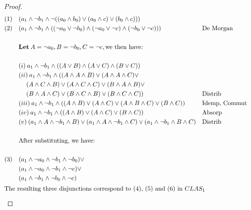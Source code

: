 \documentclass{article}
\begin{document}
\begin{proof}
\begin{align*}
	(1)  & \quad (a_1 \land \lnot b_1 \land \lnot((a_0 \land b_0) \lor (a_0 \land c) \lor (b_0 \land c)) ) \\
	(2)  & \quad (a_1 \land \lnot b_1 \land ((\lnot a_0 \lor \lnot b_0) \land (\lnot a_0 \lor \lnot c) \land (\lnot b_0 \lor \lnot c)))  && \text{De Morgan} \\ \\
	&	\quad \textbf{Let} \:  A = \lnot a_0, B = \lnot b_0, C = \lnot c, \text{we then have:} \\ \\
	& \quad (i)  \: a_1 \land \lnot b_1 \land ((A \lor B) \land (A \lor C) \land (B \lor C)) \\
	&	\quad (ii)  \: a_1 \land \lnot b_1 \land ((A \land A \land B) \lor 						(A \land A 	\land C) \lor \\
		& \qquad \: (A \land C \land B) \lor (A \land C \land C) \lor (B \land A \land B) \lor \\
		& \qquad \: (B \land A \land C) \lor (B \land C \land B) \lor
		(B \land C \land C)) && \text{Distrib} \\
	& \quad (iii)  \: a_1 \land \lnot b_1 \land ((A \land B) \lor(A \land C) \lor  (A \land B \land C) \lor (B \land C)) && \text{Idemp, Commut}  \\
	& \quad (iv)  \: a_1 \land \lnot b_1 \land ((A \land B) \lor(A \land C) \lor (B \land C)) && \text{Absorp}  \\
	& \quad (v)  \: (a_1 \land A  \land \lnot b_1 \land  B) \lor(a_1 \land A  \land \lnot b_1 \land  C) \lor (a_1  \land \lnot b_1 \land B \land C)  && \text{Distrib}  \\ \\ 
	&	\quad \text{After substituting, we have:} \\ \\
	(3)  & \quad (a_1 \land \lnot a_0  \land \lnot b_1 \land  \lnot b_0) \lor \\
		   & \quad (a_1 \land \lnot a_0  \land \lnot b_1 \land  \lnot c) \lor \\
		   & \quad (a_1  \land \lnot b_1 \land \lnot b_0 \land \lnot c)\\
	\intertext{The resulting three  disjunctions correspond to (4), (5) and (6) in $CLAS_1$}
\end{align*}
	
\end{proof}
\end{document}
